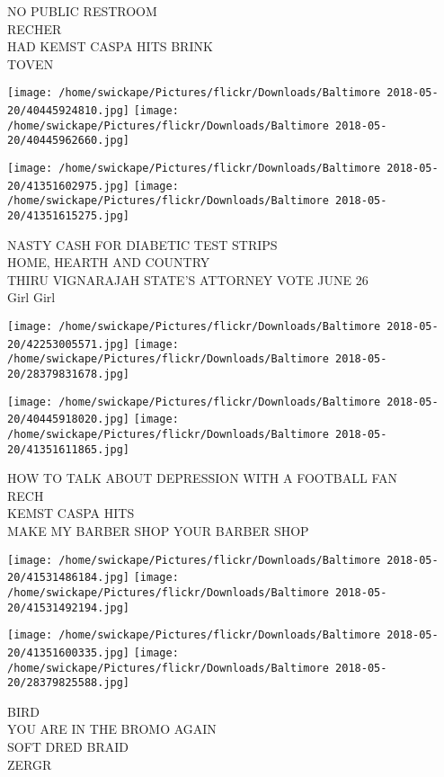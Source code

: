 \documentclass[10pt,letterpaper]{article}
\begin{document}
NO PUBLIC RESTROOM\\
RECHER\\
HAD KEMST CASPA HITS BRINK\\
TOVEN\\
\pagebreak

\texttt{[image: /home/swickape/Pictures/flickr/Downloads/Baltimore 2018-05-20/40445924810.jpg]}
\texttt{[image: /home/swickape/Pictures/flickr/Downloads/Baltimore 2018-05-20/40445962660.jpg]}

\texttt{[image: /home/swickape/Pictures/flickr/Downloads/Baltimore 2018-05-20/41351602975.jpg]}
\texttt{[image: /home/swickape/Pictures/flickr/Downloads/Baltimore 2018-05-20/41351615275.jpg]}

NASTY CASH FOR DIABETIC TEST STRIPS\\
HOME, HEARTH AND COUNTRY\\
THIRU VIGNARAJAH STATE'S ATTORNEY VOTE JUNE 26\\
Girl Girl\\
\pagebreak

\texttt{[image: /home/swickape/Pictures/flickr/Downloads/Baltimore 2018-05-20/42253005571.jpg]}
\texttt{[image: /home/swickape/Pictures/flickr/Downloads/Baltimore 2018-05-20/28379831678.jpg]}

\texttt{[image: /home/swickape/Pictures/flickr/Downloads/Baltimore 2018-05-20/40445918020.jpg]}
\texttt{[image: /home/swickape/Pictures/flickr/Downloads/Baltimore 2018-05-20/41351611865.jpg]}

HOW TO TALK ABOUT DEPRESSION WITH A FOOTBALL FAN\\
RECH\\
KEMST CASPA HITS\\
MAKE MY BARBER SHOP YOUR BARBER SHOP\\
\pagebreak

\texttt{[image: /home/swickape/Pictures/flickr/Downloads/Baltimore 2018-05-20/41531486184.jpg]}
\texttt{[image: /home/swickape/Pictures/flickr/Downloads/Baltimore 2018-05-20/41531492194.jpg]}

\texttt{[image: /home/swickape/Pictures/flickr/Downloads/Baltimore 2018-05-20/41351600335.jpg]}
\texttt{[image: /home/swickape/Pictures/flickr/Downloads/Baltimore 2018-05-20/28379825588.jpg]}

BIRD\\
YOU ARE IN THE BROMO AGAIN\\
SOFT DRED BRAID\\
ZERGR\\
\pagebreak
\end{document}
